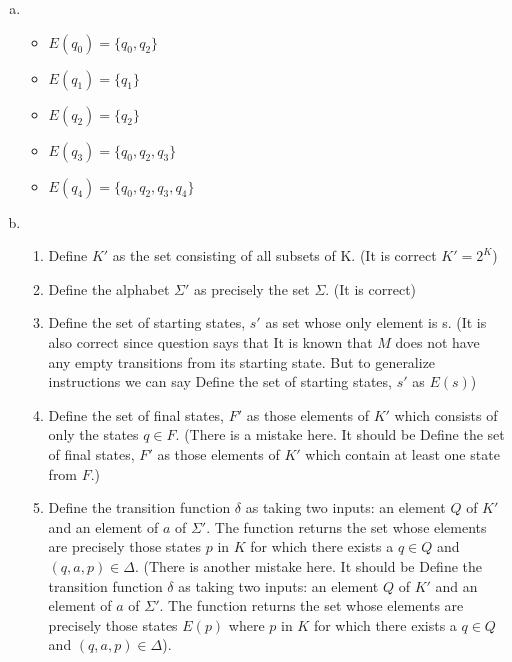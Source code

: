 \documentclass[12pt]{article}
\begin{document}
\begin{enumerate}[a)]
    \item 
        \begin{itemize}
            \item $E(q_0) = \{q_0, q_2\}$
            \item $E(q_1) = \{q_1\}$
            \item $E(q_2) = \{q_2\}$
            \item $E(q_3) = \{q_0,q_2,q_3\}$
            \item $E(q_4)  = \{q_0,q_2,q_3,q_4\}$
        \end{itemize}
    \item 
        \begin{enumerate}[1)]
            \item Define $K'$ as the set consisting of all subsets of K. (It is correct $K'=2^K$)
            \item Define the alphabet $\Sigma'$ as precisely the set $\Sigma$. (It is correct)
            \item Define the set of starting states, $s'$ as set whose only element is s. (It is also correct since question says that It is known that $M$ does not have any empty transitions from its starting state. But to generalize instructions we can say Define the set of starting states, $s'$ as $E(s)$)
            \item Define the set of final states, $F'$ as those elements of $K'$ which consists of only the states $q \in F$. (There is a mistake here. It should be Define the set of final states, $F'$ as those elements of $K'$ which contain at least one state from $F$.)
            \item Define the transition function $\delta$ as taking two inputs: an element $Q$ of $K'$ and an element of $a$ of $\Sigma'$. The function returns the set whose elements are precisely those states $p$ in $K$ for which there exists a $q \in Q$ and $(q,a,p) \in \Delta$. (There is another mistake here. It should be Define the transition function $\delta$ as taking two inputs: an element $Q$ of $K'$ and an element of $a$ of $\Sigma'$. The function returns the set whose elements are precisely those states $E(p)$ where $p$ in $K$ for which there exists a $q \in Q$ and $(q,a,p) \in \Delta$).
        \end{enumerate}

    
\end{enumerate}
\end{document}
